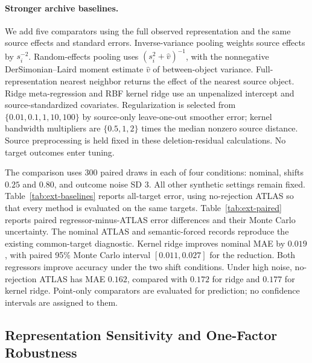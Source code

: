 \documentclass[11pt]{article}
\numberwithin{equation}{section}
\newcommand{\1}{\mathbf 1}
\begin{document}


\paragraph{Stronger archive baselines.}
We add five comparators using the full observed representation and the same source effects and standard errors. Inverse-variance pooling weights source effects by $s_i^{-2}$. Random-effects pooling uses $(s_i^2+\widehat v)^{-1}$, with the nonnegative DerSimonian--Laird moment estimate $\widehat v$ of between-object variance. Full-representation nearest neighbor returns the effect of the nearest source object. Ridge meta-regression and RBF kernel ridge use an unpenalized intercept and source-standardized covariates. Regularization is selected from $\{0.01,0.1,1,10,100\}$ by source-only leave-one-out smoother error; kernel bandwidth multipliers are $\{0.5,1,2\}$ times the median nonzero source distance. Source preprocessing is held fixed in these deletion-residual calculations. No target outcomes enter tuning.

The comparison uses 300 paired draws in each of four conditions: nominal, shifts $0.25$ and $0.80$, and outcome noise SD $3$. All other synthetic settings remain fixed. Table~\ref{tab:ext-baselines} reports all-target error, using no-rejection ATLAS so that every method is evaluated on the same targets. Table~\ref{tab:ext-paired} reports paired regressor-minus-ATLAS error differences and their Monte Carlo uncertainty. The nominal ATLAS and semantic-forced records reproduce the existing common-target diagnostic. Kernel ridge improves nominal MAE by $0.019$, with paired 95\% Monte Carlo interval $[0.011,0.027]$ for the reduction. Both regressors improve accuracy under the two shift conditions. Under high noise, no-rejection ATLAS has MAE $0.162$, compared with $0.172$ for ridge and $0.177$ for kernel ridge. Point-only comparators are evaluated for prediction; no confidence intervals are assigned to them.




\subsection{Representation Sensitivity and One-Factor Robustness}
\label{app:representation-sensitivity}
\suppressfloats[t]
\end{document}
